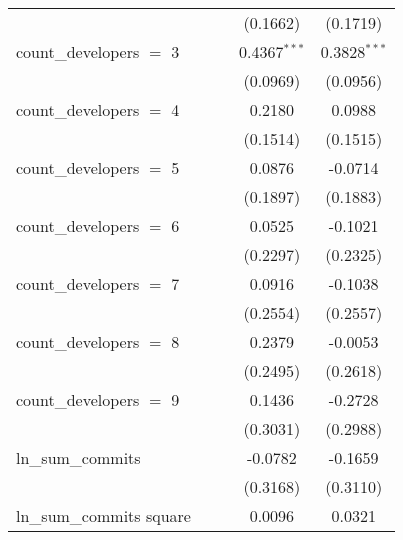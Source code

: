 \begin{tabular}{lcccc}
                                        &                &                & (0.1662)       & (0.1719)\\   
   count\_developers $=$ 3              &                &                & 0.4367$^{***}$ & 0.3828$^{***}$\\   
                                        &                &                & (0.0969)       & (0.0956)\\   
   count\_developers $=$ 4              &                &                & 0.2180         & 0.0988\\   
                                        &                &                & (0.1514)       & (0.1515)\\   
   count\_developers $=$ 5              &                &                & 0.0876         & -0.0714\\   
                                        &                &                & (0.1897)       & (0.1883)\\   
   count\_developers $=$ 6              &                &                & 0.0525         & -0.1021\\   
                                        &                &                & (0.2297)       & (0.2325)\\   
   count\_developers $=$ 7              &                &                & 0.0916         & -0.1038\\   
                                        &                &                & (0.2554)       & (0.2557)\\   
   count\_developers $=$ 8              &                &                & 0.2379         & -0.0053\\   
                                        &                &                & (0.2495)       & (0.2618)\\   
   count\_developers $=$ 9              &                &                & 0.1436         & -0.2728\\   
                                        &                &                & (0.3031)       & (0.2988)\\   
   ln\_sum\_commits                     &                &                & -0.0782        & -0.1659\\   
                                        &                &                & (0.3168)       & (0.3110)\\   
   ln\_sum\_commits square              &                &                & 0.0096         & 0.0321\\   

\end{tabular}
